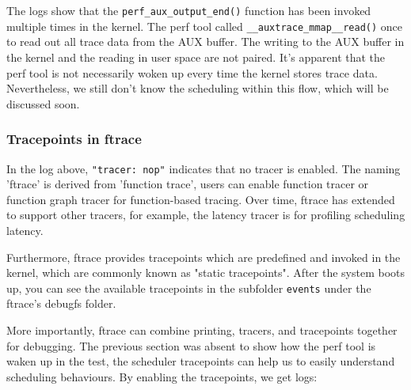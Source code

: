 \documentclass[11pt]{diazessay} %
\def\code#1{\texttt{#1}}
\begin{document}
The logs show that the \code{perf\_aux\_output\_end()} function has been
invoked multiple times in the kernel. The perf tool called
\code{\_\_auxtrace\_mmap\_\_read()} once to read out all trace data from the AUX
buffer. The writing to the AUX buffer in the kernel and the reading in user
space are not paired. It's apparent that the perf tool is not necessarily woken
up every time the kernel stores trace data. Nevertheless, we still don't
know the scheduling within this flow, which will be discussed soon.

\subsubsection*{Tracepoints in ftrace}

In the log above, \code{"tracer:\ nop"} indicates that no tracer is enabled.
The naming 'ftrace' is derived from 'function trace', users can enable
function tracer or function graph tracer for function-based tracing. Over time,
ftrace has extended to support other tracers, for example, the latency tracer
is for profiling scheduling latency.

Furthermore, ftrace provides tracepoints which are predefined and invoked in
the kernel, which are commonly known as "static tracepoints". After
the system boots up, you can see the available tracepoints in the subfolder
\code{events} under the ftrace's debugfs folder.

More importantly, ftrace can combine printing, tracers, and tracepoints
together for debugging. The previous section was absent to show how the perf
tool is waken up in the test, the scheduler tracepoints can help us to easily
understand scheduling behaviours. By enabling the tracepoints, we get logs:
\end{document}
